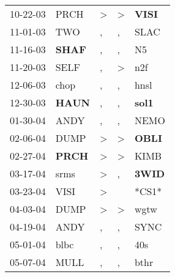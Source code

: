 \begin{supertabular}{p{0.07\textwidth}p{0.06\textwidth}p{0.02\textwidth}p{0.02\textwidth}p{0.06\textwidth}}
          10-22-03\textsuperscript{} &           PRCH\textsuperscript{} &     \textgreater &  \textgreater &  \textbf{VISI\textsuperscript{}} \\
          11-01-03\textsuperscript{} &            TWO\textsuperscript{} &                , &             , &           SLAC\textsuperscript{} \\
          11-16-03\textsuperscript{} &  \textbf{SHAF\textsuperscript{}} &                , &             , &             N5\textsuperscript{} \\
          11-20-03\textsuperscript{} &           SELF\textsuperscript{} &                , &  \textgreater &            n2f\textsuperscript{} \\
          12-06-03\textsuperscript{} &           chop\textsuperscript{} &                , &             , &           hnsl\textsuperscript{} \\
          12-30-03\textsuperscript{} &  \textbf{HAUN\textsuperscript{}} &                , &             , &  \textbf{sol1\textsuperscript{}} \\
          01-30-04\textsuperscript{} &           ANDY\textsuperscript{} &                , &             , &           NEMO\textsuperscript{} \\
          02-06-04\textsuperscript{} &           DUMP\textsuperscript{} &     \textgreater &  \textgreater &  \textbf{OBLI\textsuperscript{}} \\
          02-27-04\textsuperscript{} &  \textbf{PRCH\textsuperscript{}} &     \textgreater &  \textgreater &           KIMB\textsuperscript{} \\
          03-17-04\textsuperscript{} &           srms\textsuperscript{} &     \textgreater &             , &  \textbf{3WID\textsuperscript{}} \\
          03-23-04\textsuperscript{} &           VISI\textsuperscript{} &     \textgreater &               &                            *CS1* \\
          04-03-04\textsuperscript{} &           DUMP\textsuperscript{} &     \textgreater &  \textgreater &           wgtw\textsuperscript{} \\
          04-19-04\textsuperscript{} &           ANDY\textsuperscript{} &                , &             , &           SYNC\textsuperscript{} \\
          05-01-04\textsuperscript{} &           blbc\textsuperscript{} &                , &             , &            40s\textsuperscript{} \\
          05-07-04\textsuperscript{} &           MULL\textsuperscript{} &                , &             , &           bthr\textsuperscript{} \\

\end{supertabular}
